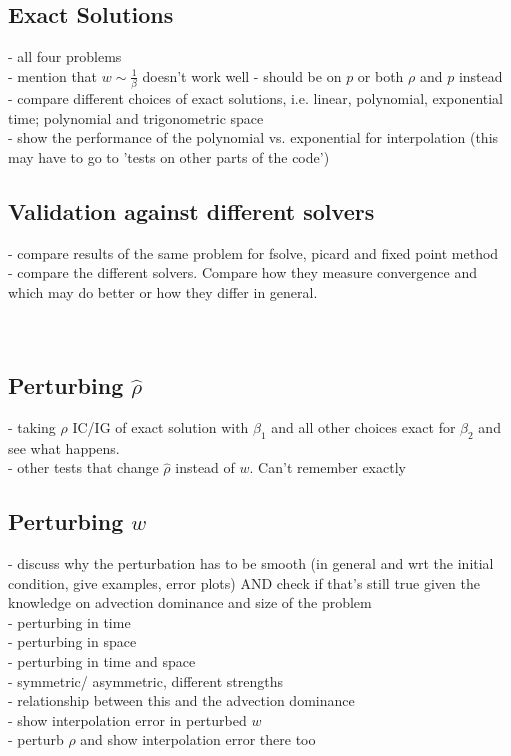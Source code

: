 \documentclass[11pt, a4paper]{article}
\theoremstyle{definition}
\begin{document}
\subsection{Exact Solutions}
- all four problems \\
- mention that $w \sim \frac{1}{\beta}$ doesn't work well - should be on $p$ or both $\rho$ and $p$ instead \\
- compare different choices of exact solutions, i.e. linear, polynomial, exponential time; polynomial and trigonometric space \\
- show the performance of the polynomial vs. exponential for interpolation (this may have to go to 'tests on other parts of the code') \\
\subsection{Validation against different solvers}
- compare results of the same problem for fsolve, picard and fixed point method\\
- compare the different solvers. Compare how they measure convergence and which may do better or how they differ in general.\\
\\
\\


\subsection{Perturbing $\hat \rho$}
- taking $\rho$ IC/IG of exact solution with $\beta_1$ and all other choices exact for $\beta_2$ and see what happens. \\
- other tests that change $\hat \rho$ instead of $w$. Can't remember exactly
\subsection{Perturbing $w$}
- discuss why the perturbation has to be smooth (in general and wrt the initial condition, give examples, error plots) AND check if that's still true given the knowledge on advection dominance and size of the problem\\
- perturbing in time \\
- perturbing in space \\
- perturbing in time and space \\
- symmetric/ asymmetric, different strengths\\
- relationship between this and the advection dominance\\
- show interpolation error in perturbed $w$\\
- perturb $\rho$ and show interpolation error there too\\
\\
\\

\end{document}
